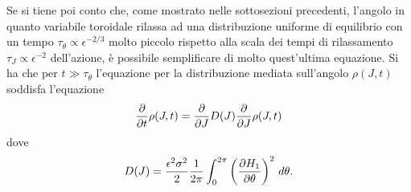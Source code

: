 \documentclass[10pt,a4paper]{article}
\begin{document}
Se si tiene poi conto che, come mostrato nelle sottosezioni precedenti, l'angolo in quanto variabile toroidale rilassa ad una distribuzione uniforme di equilibrio con un tempo \(\tau_{\theta} \propto \epsilon^{-2/3}\) molto piccolo rispetto alla scala dei tempi di rilassamento \(\tau_{J} \propto \epsilon^{-2}\) dell'azione, è possibile semplificare di molto quest'ultima equazione. Si ha che per \(t\gg\tau_{\theta}\) l'equazione per la distribuzione mediata sull'angolo \(\rho(J,t)\) soddisfa l'equazione
\begin{equation}
	\pdv{}{t}\rho(J,t) = \pdv{}{J}D(J)\pdv{}{J}\rho(J,t)
\end{equation}
dove
\begin{equation}
	D(J) = \frac{\epsilon^2 \sigma^2}{2}\frac{1}{2\pi}\int_0^{2\pi}\left(\pdv{H_1}{\theta}\right)^2 \,d\theta.
\end{equation}
\end{document}
